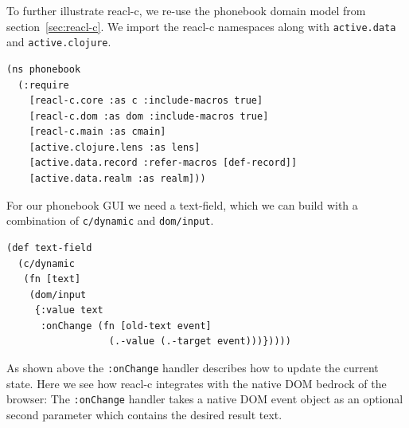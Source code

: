 \documentclass[sigplan,screen]{acmart}
\begin{document}
To further illustrate reacl-c, we re-use the phonebook domain model 
from section~\ref{sec:reacl-c}.  We import the reacl-c namespaces along with
\texttt{active.data} and \texttt{active.clojure}.
%
\begin{verbatim}
(ns phonebook
  (:require
    [reacl-c.core :as c :include-macros true]
    [reacl-c.dom :as dom :include-macros true]
    [reacl-c.main :as cmain]
    [active.clojure.lens :as lens]
    [active.data.record :refer-macros [def-record]]
    [active.data.realm :as realm]))
\end{verbatim}
%
For our phonebook GUI we need a text-field, which we can build
with a combination of \texttt{c/dynamic} and \texttt{dom/input}.
%
\begin{verbatim}
(def text-field
  (c/dynamic
   (fn [text]
    (dom/input
     {:value text
      :onChange (fn [old-text event]
                  (.-value (.-target event)))}))))
\end{verbatim}
%
As shown above the \texttt{:onChange} handler describes how to update
the current state.  Here we see how reacl-c integrates with the native
DOM bedrock of the browser: The \texttt{:onChange} handler takes a
native DOM event object as an optional second
parameter which contains the desired result text.
\end{document}
